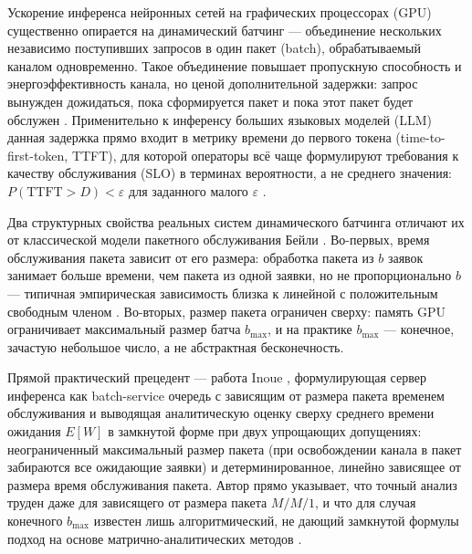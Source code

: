 \documentclass[12pt,a4paper]{article}
\newcommand{\articlesection}[1]{\par\vspace{14pt}{\bfseries #1}\par\vspace{6pt}\nopagebreak}
\begin{document}
\renewcommand{\figurename}{Рисунок}
\renewcommand{\tablename}{Таблица}

\articlesection{Введение}

Ускорение инференса нейронных сетей на графических процессорах (GPU) существенно опирается на динамический батчинг --- объединение нескольких независимо поступивших запросов в один пакет (batch), обрабатываемый каналом одновременно. Такое объединение повышает пропускную способность и энергоэффективность канала, но ценой дополнительной задержки: запрос вынужден дожидаться, пока сформируется пакет и пока этот пакет будет обслужен \cite{inoue2021}. Применительно к инференсу больших языковых моделей (LLM) данная задержка прямо входит в метрику времени до первого токена (time-to-first-token, TTFT), для которой операторы всё чаще формулируют требования к качеству обслуживания (SLO) в терминах вероятности, а не среднего значения: $P(\mathrm{TTFT}>D)<\varepsilon$ для заданного малого $\varepsilon$ \cite{quartz2026,jitserve2026}.

Два структурных свойства реальных систем динамического батчинга отличают их от классической модели пакетного обслуживания Бейли \cite{bailey1954}. Во-первых, время обслуживания пакета зависит от его размера: обработка пакета из $b$ заявок занимает больше времени, чем пакета из одной заявки, но не пропорционально $b$ --- типичная эмпирическая зависимость близка к линейной с положительным свободным членом \cite{inoue2021}. Во-вторых, размер пакета ограничен сверху: память GPU ограничивает максимальный размер батча $b_{\max}$, и на практике $b_{\max}$ --- конечное, зачастую небольшое число, а не абстрактная бесконечность.

Прямой практический прецедент --- работа Inoue \cite{inoue2021}, формулирующая сервер инференса как batch-service очередь с зависящим от размера пакета временем обслуживания и выводящая аналитическую оценку сверху среднего времени ожидания $E[W]$ в замкнутой форме при двух упрощающих допущениях: неограниченный максимальный размер пакета (при освобождении канала в пакет забираются все ожидающие заявки) и детерминированное, линейно зависящее от размера время обслуживания пакета. Автор прямо указывает, что точный анализ труден даже для зависящего от размера пакета $M/M/1$, и что для случая конечного $b_{\max}$ известен лишь алгоритмический, не дающий замкнутой формулы подход на основе матрично-аналитических методов \cite{neuts1989}.
\end{document}
